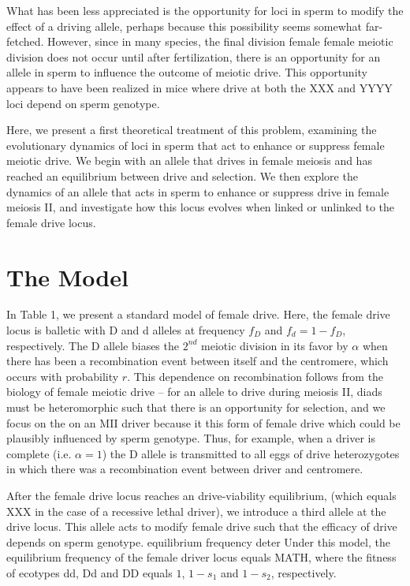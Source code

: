 \documentclass[12pt,letterpaper]{article}
\begin{document}
What has been less appreciated is the opportunity for loci in sperm to modify the effect of a driving allele, perhaps because this possibility seems somewhat far-fetched.
However, since in many species, the final division female female meiotic division does not occur until after fertilization, there is an opportunity for an allele in sperm to influence the outcome of meiotic drive.
This opportunity appears to have been realized in mice where drive at both the XXX and YYYY loci depend on sperm genotype.

Here, we present a first theoretical treatment of this problem, examining the evolutionary dynamics of loci  in sperm that act to enhance or suppress female meiotic drive.
We begin with an allele that drives in female meiosis and has reached an equilibrium between drive and selection.
We then explore the dynamics of an allele that acts in sperm to enhance or suppress drive in female meiosis II, and investigate how this locus evolves when linked or unlinked to the female drive locus.

\newpage
\section*{The Model}
In Table 1, we present a standard model of female drive. 
Here, the female drive locus is balletic with D and d alleles at frequency $f_D$ and $f_d = 1 -f_D$, respectively.
The D  allele biases the $2^{nd}$ meiotic division in its favor by $\alpha$ when there has been a recombination event between itself and the centromere, which occurs with probability $r$. 
This dependence on recombination follows from the biology of female meiotic drive -- for an allele to drive during meiosis II, diads must be heteromorphic such that there is an opportunity for selection, and we focus on the on an MII driver because it this form of female drive which could be plausibly influenced by sperm genotype.
Thus, for example, when a driver is complete (i.e. $\alpha = 1$) the D allele is transmitted to all eggs of drive heterozygotes in which there was a recombination event between driver and centromere.

After the female drive locus reaches an drive-viability equilibrium, (which equals XXX in the case of a recessive lethal driver), we introduce a third allele at the drive locus.
This allele acts to modify female drive such that the efficacy of drive depends on sperm genotype. 
 equilibrium frequency deter  Under this model, the equilibrium frequency of the female driver locus equals MATH, where the fitness of ecotypes dd, Dd and DD equals $1$, $1-s_1$ and $1-s_2$, respectively.
\end{document}
